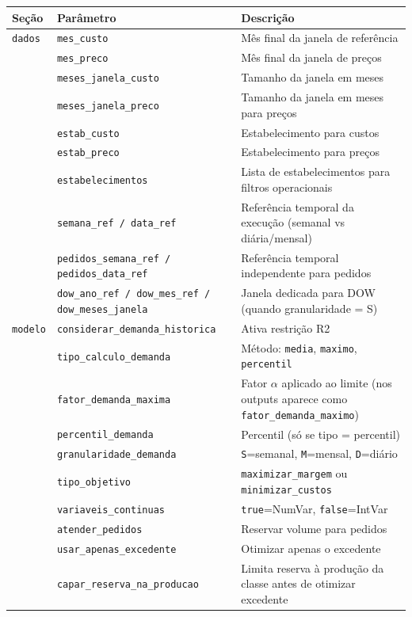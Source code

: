 \documentclass[11pt,a4paper]{article}
\begin{document}
\begin{longtable}{llp{7cm}}
\toprule
\textbf{Seção} & \textbf{Parâmetro} & \textbf{Descrição} \\
\midrule
\endhead
\texttt{dados} & \texttt{mes\_custo} & Mês final da janela de referência \\
& \texttt{mes\_preco} & Mês final da janela de preços \\
& \texttt{meses\_janela\_custo} & Tamanho da janela em meses \\
& \texttt{meses\_janela\_preco} & Tamanho da janela em meses para preços \\
& \texttt{estab\_custo} & Estabelecimento para custos \\
& \texttt{estab\_preco} & Estabelecimento para preços \\
& \texttt{estabelecimentos} & Lista de estabelecimentos para filtros operacionais \\
& \texttt{semana\_ref / data\_ref} & Referência temporal da execução (semanal vs diária/mensal) \\
& \texttt{pedidos\_semana\_ref / pedidos\_data\_ref} & Referência temporal independente para pedidos \\
& \texttt{dow\_ano\_ref / dow\_mes\_ref / dow\_meses\_janela} & Janela dedicada para DOW (quando granularidade = S) \\
\midrule
\texttt{modelo} & \texttt{considerar\_demanda\_historica} & Ativa restrição R2 \\
& \texttt{tipo\_calculo\_demanda} & Método: \texttt{media}, \texttt{maximo}, \texttt{percentil} \\
& \texttt{fator\_demanda\_maxima} & Fator $\alpha$ aplicado ao limite (nos outputs aparece como \texttt{fator\_demanda\_maximo}) \\
& \texttt{percentil\_demanda} & Percentil (só se tipo = percentil) \\
& \texttt{granularidade\_demanda} & \texttt{S}=semanal, \texttt{M}=mensal, \texttt{D}=diário \\
& \texttt{tipo\_objetivo} & \texttt{maximizar\_margem} ou \texttt{minimizar\_custos} \\
& \texttt{variaveis\_continuas} & \texttt{true}=NumVar, \texttt{false}=IntVar \\
& \texttt{atender\_pedidos} & Reservar volume para pedidos \\
& \texttt{usar\_apenas\_excedente} & Otimizar apenas o excedente \\
& \texttt{capar\_reserva\_na\_producao} & Limita reserva à produção da classe antes de otimizar excedente \\

\end{longtable}
\end{document}

